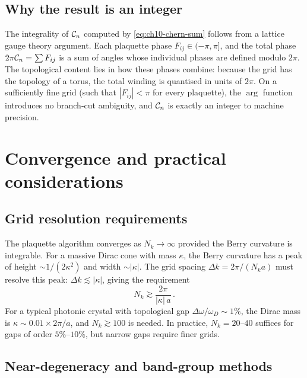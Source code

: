 \subsection{Why the result is an integer}
\label{sec:ch10-integer}

The integrality of $\mathcal{C}_n$ computed by \eqref{eq:ch10-chern-sum}
follows from a lattice gauge theory argument.  Each plaquette phase
$F_{ij}\in(-\pi,\pi]$, and the total phase $2\pi\mathcal{C}_n=\sum F_{ij}$
is a sum of angles whose individual phases are defined modulo $2\pi$.
The topological content lies in how these phases combine: because the
grid has the topology of a torus, the total winding is quantised in
units of $2\pi$.  On a sufficiently fine grid (such that $|F_{ij}|<\pi$
for every plaquette), the $\arg$ function introduces no branch-cut
ambiguity, and $\mathcal{C}_n$ is exactly an integer to machine precision.

\section{Convergence and practical considerations}
\label{sec:ch10-convergence}

\subsection{Grid resolution requirements}
\label{sec:ch10-grid-res}

The plaquette algorithm converges as $N_k\to\infty$ provided the Berry
curvature is integrable.  For a massive Dirac cone with mass $\kappa$,
the Berry curvature has a peak of height $\sim 1/(2\kappa^2)$ and
width $\sim|\kappa|$.  The grid spacing $\Delta k=2\pi/(N_k a)$ must
resolve this peak: $\Delta k\lesssim|\kappa|$, giving the requirement
\begin{equation}\label{eq:ch10-Nk-min}
  N_k \gtrsim \frac{2\pi}{|\kappa|\,a}\,.
\end{equation}
For a typical photonic crystal with topological gap
$\Delta\omega/\omega_D\sim 1\%$, the Dirac mass is
$\kappa\sim 0.01\times 2\pi/a$, and $N_k\gtrsim 100$ is needed.
In practice, $N_k=20$--$40$ suffices for gaps of order $5\%$--$10\%$,
but narrow gaps require finer grids.

\subsection{Near-degeneracy and band-group methods}
\label{sec:ch10-near-degeneracy}


